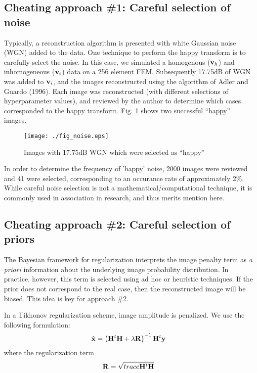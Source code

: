 \documentclass[12pt]{iopart}
\begin{document}
\subsection{ Cheating approach \#1:
 Careful selection of noise }

Typically, a reconstruction algorithm is presented
with white Gaussian noise (WGN) added to the data. One
technique to perform the happy transform is to
carefully select the noise.
In this case, we simulated a homogenous (${\bf v}_h$)
and inhomogeneous (${\bf v}_i$) data on a 256
element FEM. Subsequently 17.75dB of WGN was added to
${\bf v}_i$, and the images reconstructed using
the algorithm of Adler and Guardo (1996).
Each image was reconstructed (with different selections of
hyperparameter values), and reviewed by the author to determine which cases
corresponded to the happy transform.
Fig. \ref{fig:happynoise} shows two successful
``happy'' images.

%
%
\begin{figure}[th]
\begin{flushright}
\texttt{[image: ./fig\_noise.eps]}
\caption{\small 
Images with 17.75dB WGN which were selected as ``happy''
 }
 \label{fig:happynoise}
\end{flushright}
\end{figure}

In order to determine the frequency of 'happy' noise, 2000
images were reviewed and 41 were selected, corresponding
to an occurance rate of approximately 2\%.
While careful noise selection is not a mathematical/computational
technique, it is commonly used in association in research,
and thus merits mention here.

\subsection{ Cheating approach \#2:
             Careful selection of priors}

The Bayesian framework for regularization interprets
the image penalty term as {\em a priori} information 
about the underlying image probability distribution.
In practice, however, this term is selected using
ad hoc or heuristic techniques. If the prior does
not correspond to the real case, then the reconstructed
image will be biased. This idea is key for approach \#2.

In a Tikhonov regularization scheme, image amplitude
is penalized. We use the following formulation:
\begin{equation}
   \hat{\bf x} = 
   \left({\bf H}^t{\bf H} + \lambda{\bf R}\right)^{-1}
         {\bf H}^t{\bf y}
\end{equation}
where the regularization term 
\begin{equation}
   {\bf R} = \sqrt{ trace {\bf H}^t{\bf H} }
\end{equation}
\end{document}
